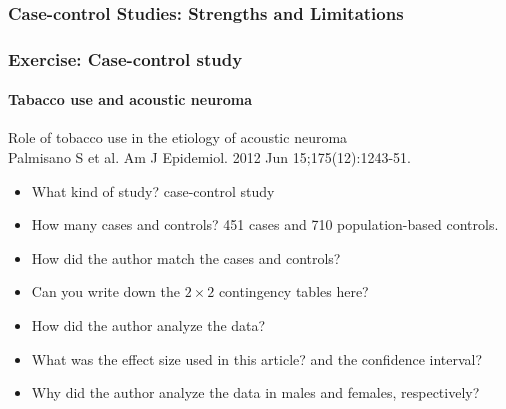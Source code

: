 \documentclass[table,10pt]{beamer}
\begin{document}
\begin{CJK*}{UTF8}{gbsn}
\begin{frame}[t]
\frametitle{Case-control Studies: Strengths and Limitations}

\end{frame}

\begin{frame}[t]
\frametitle{Exercise: Case-control study}
\framesubtitle{Tabacco use and acoustic neuroma}
{\large \alert{Role of tobacco use in the etiology of acoustic neuroma}}\\
\small{Palmisano S et al. Am J Epidemiol. 2012 Jun 15;175(12):1243-51.}
\begin{itemize}
	\item What kind of study? \alert{case-control study}
	\item How many cases and controls? \alert{451 cases} and \alert{710 
		population-based controls.}
	\item How did the author match the cases and controls?
	\item Can you write down the $2\times 2$ contingency tables here?
	\item How did the author analyze the data?
	\item What was the effect size used in this article? and the confidence 
		interval?
	\item Why did the author analyze the data in males and females, respectively?
\end{itemize}
\end{frame}


\end{CJK*}
\end{document}
